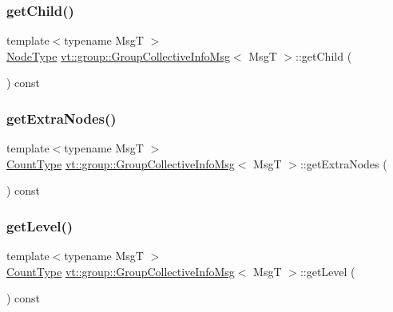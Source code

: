 \subsubsection{\texorpdfstring{get\+Child()}{getChild()}}
{\footnotesize\ttfamily template$<$typename MsgT $>$ \\
\hyperlink{namespacevt_a866da9d0efc19c0a1ce79e9e492f47e2}{Node\+Type} \hyperlink{structvt_1_1group_1_1_group_collective_info_msg}{vt\+::group\+::\+Group\+Collective\+Info\+Msg}$<$ MsgT $>$\+::get\+Child (\begin{DoxyParamCaption}{ }\end{DoxyParamCaption}) const\hspace{0.3cm}{\ttfamily [inline]}}

\mbox{\label{structvt_1_1group_1_1_group_collective_info_msg_af573fdf277066cbd0e7337503177a467}} 
\subsubsection{\texorpdfstring{get\+Extra\+Nodes()}{getExtraNodes()}}
{\footnotesize\ttfamily template$<$typename MsgT $>$ \\
\hyperlink{structvt_1_1group_1_1_group_collective_info_msg_a3d20316314d3cc3ac13ff4c5250203a5}{Count\+Type} \hyperlink{structvt_1_1group_1_1_group_collective_info_msg}{vt\+::group\+::\+Group\+Collective\+Info\+Msg}$<$ MsgT $>$\+::get\+Extra\+Nodes (\begin{DoxyParamCaption}{ }\end{DoxyParamCaption}) const\hspace{0.3cm}{\ttfamily [inline]}}

\mbox{\label{structvt_1_1group_1_1_group_collective_info_msg_a368f82322f36599841188bfe9fb8d4e6}} 
\subsubsection{\texorpdfstring{get\+Level()}{getLevel()}}
{\footnotesize\ttfamily template$<$typename MsgT $>$ \\
\hyperlink{structvt_1_1group_1_1_group_collective_info_msg_a3d20316314d3cc3ac13ff4c5250203a5}{Count\+Type} \hyperlink{structvt_1_1group_1_1_group_collective_info_msg}{vt\+::group\+::\+Group\+Collective\+Info\+Msg}$<$ MsgT $>$\+::get\+Level (\begin{DoxyParamCaption}{ }\end{DoxyParamCaption}) const\hspace{0.3cm}{\ttfamily [inline]}}

